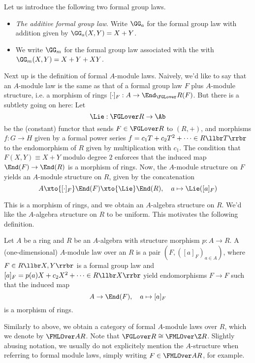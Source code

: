\begin{xpl} Let us introduce the following two formal group laws.
  \begin{itemize}
    \item \textit{The additive formal group law}. Write 
      $\GG_a$ for the formal group law with addition given by 
      $\GG_a(X,Y) = X + Y$. 
    \item We write $\GG_m$ for the formal group law associated with the 
      with $\GG_m(X,Y) = X + Y + XY$. 
  \end{itemize}
\end{xpl}

Next up is the definition of formal $A$-module laws. Naively, we'd like to say
that an $A$-module law is the same as that of a formal group law $F$
plus $A$-module structure, i.e. a morphism of rings $[\cdot]_F: A \to
\End_\FGLover R(F)$. But there is a subtlety going on here: Let 
\begin{equation*}
  \Lie: \FGLover R \to \Ab 
\end{equation*}
be the (constant) functor that sends $F \in \FGLover R$ to $(R,+)$, and morphisms
$f: G \to H$ given by a formal power series
$f = c_1 T + c_2 T^2 + \dots \in R\llbr T \rrbr$ to the endomorphism
of $R$ given by multiplication with $c_1$. The condition that 
$F(X,Y) \equiv X+Y$ modulo degree $2$ enforces that the induced map
$\End(F) \to \End(R)$ is a morphism of rings. Now, the $A$-module structure on $F$ 
yields an $A$-module structure on $R$, given by the concatenation\begin{equation*}
  A \xto{[\cdot]_F} \End(F) \xto{\Lie} \End(R), \quad a \mapsto \Lie([a]_F)
\end{equation*}

This is a morphism of rings, and we obtain an $A$-algebra structure on $R$. We'd
like the $A$-algebra structure on $R$ to be uniform. This
motivates the following definition.
\begin{defi}
  Let $A$ be a ring and $R$ be an $A$-algebra with structure
  morphism $p: A \to R$. A (one-dimensional) $A$-module law over an $R$ is a
  pair $(F, ([a]_F)_{a \in A})$, where $F \in R\llbr X,Y \rrbr$ is 
  a formal group law and $[a]_F = p(a)X + c_2X^2 + \dots 
  \in R\llbr X \rrbr$ yield endomorphisms $F \to F$ such that the induced map
  \begin{equation*}
    A \to \End(F), \quad a \mapsto [a]_F 
  \end{equation*}
  is a morphism of rings.
\end{defi}
Similarly to above, we obtain a category of formal $A$-module laws over $R$,
which we denote by $\FMLOver A R$. Note that $\FGLover R \cong \FMLOver \Z R$.
Slightly abusing notation, we usually do not explicitely mention the $A$-structure
when referring to formal module laws, simply writing $F \in \FMLOver AR$, for
example. 


